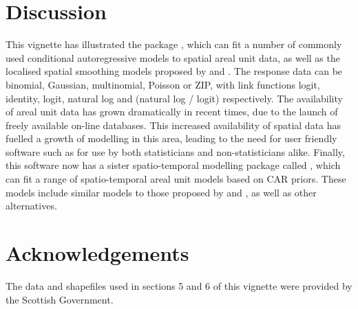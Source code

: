 \documentclass[article,shortnames,nojss]{jss}
\begin{document}
\section{Discussion}
This vignette has illustrated the  package , which can fit a number of commonly used  conditional autoregressive models to spatial areal unit data, as well as the localised spatial smoothing models proposed by \cite{lee2012} and \cite{lee2015}. The response data can be binomial, Gaussian, multinomial, Poisson or ZIP, with link functions logit, identity, logit, natural log and (natural log / logit) respectively. The availability of areal unit data has grown dramatically in recent times, due to the launch of freely available on-line databases. This increased availability of spatial data has fuelled a growth of modelling in this area, leading to the need for user friendly software such as  for use by both statisticians and non-statisticians alike. Finally, this software now has a sister spatio-temporal modelling package called , which can fit a range of spatio-temporal areal unit models based on CAR priors. These models include similar models to those proposed by \cite{bernardinelli1995} and \cite{knorrheld2000b}, as well as other alternatives.

\section*{Acknowledgements}
The data and shapefiles used in sections 5 and 6 of this vignette were provided by the Scottish Government.



\end{document}
